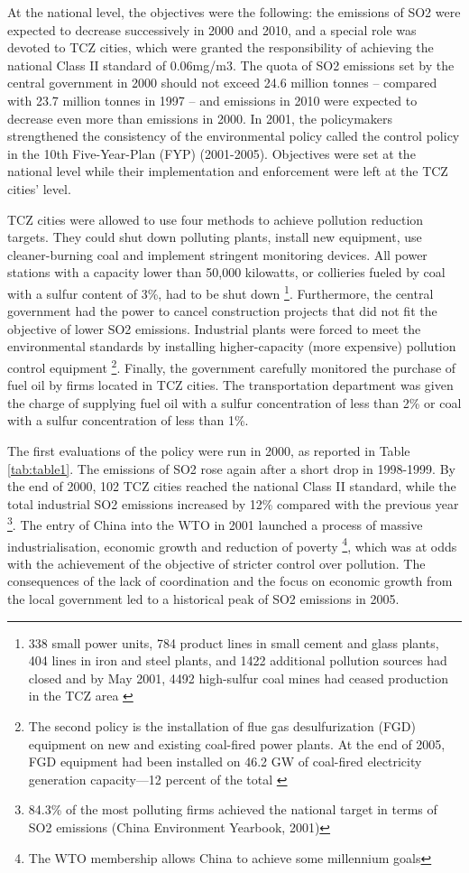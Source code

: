 \documentclass[12pt]{article}
\begin{document}
At the national level, the objectives were the following: the emissions of SO2 were expected to decrease successively in 2000 and 2010, and a special role was devoted to TCZ cities, which were granted the responsibility of achieving the national Class II standard of 0.06mg/m3. The quota of SO2 emissions set by the central government in 2000 should not exceed 24.6 million tonnes – compared with 23.7 million tonnes in 1997 – and emissions in 2010 were expected to decrease even more than emissions in 2000. In 2001, the policymakers strengthened the consistency of the environmental policy called the control policy in the 10th Five-Year-Plan (FYP) (2001-2005). Objectives were set at the national level while their implementation and enforcement were left at the TCZ cities' level.

TCZ cities were allowed to use four methods to achieve pollution reduction targets. They could shut down polluting plants, install new equipment, use cleaner-burning coal and implement stringent monitoring devices. All power stations with a capacity lower than 50,000 kilowatts, or collieries fueled by coal with a sulfur content of 3\%, had to be shut down \footnote{338 small power units, 784 product lines in small cement and glass plants, 404 lines in iron and steel plants, and 1422 additional pollution sources had closed and by May 2001, 4492 high-sulfur coal mines had ceased production in the TCZ area \citep{He2002-ga}}. Furthermore, the central government had the power to cancel construction projects that did not fit the objective of lower SO2 emissions. Industrial plants were forced to meet the environmental standards by installing higher-capacity (more expensive) pollution control equipment \footnote{The second policy is the installation of flue gas desulfurization (FGD) equipment on new and existing coal-fired power plants. At the end of 2005, FGD equipment had been installed on 46.2 GW of coal-fired electricity generation capacity—12 percent of the total \citep{Cao2009-sv}}. Finally, the government carefully monitored the purchase of fuel oil by firms located in TCZ cities. The transportation department was given the charge of supplying fuel oil with a sulfur concentration of less than 2\% or coal with a sulfur concentration of less than 1\%.

The first evaluations of the policy were run in 2000, as reported in  Table \ref{tab:table1}. The emissions of SO2 rose again after a short drop in 1998-1999. By the end of 2000, 102 TCZ cities reached the national Class II standard, while the total industrial SO2 emissions increased by 12\% compared with the previous year \footnote{84.3\% of the most polluting firms achieved the national target in terms of SO2 emissions  (China Environment Yearbook, 2001)}. The entry of China into the WTO in 2001 launched a process of massive industrialisation, economic growth and reduction of poverty \footnote{The WTO membership allows China to achieve some millennium goals}, which was at odds with the achievement of the objective of stricter control over pollution. The consequences of the lack of coordination and the focus on economic growth from the local government led to a historical peak of SO2 emissions in 2005.
\end{document}
